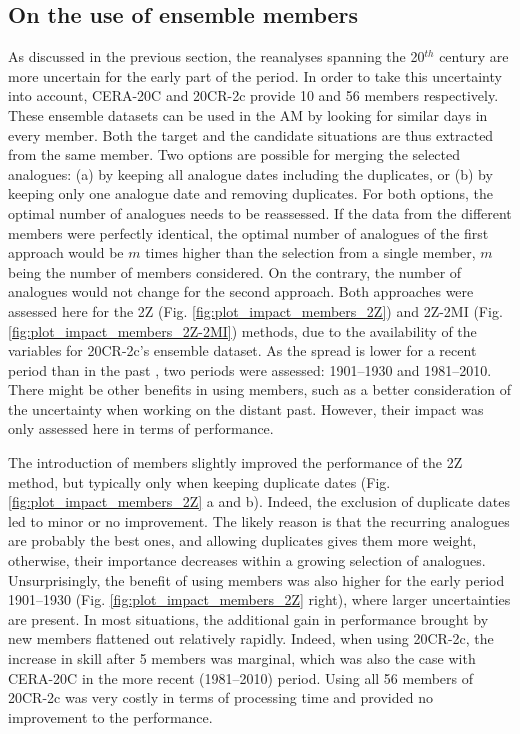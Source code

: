 \documentclass{ametsoc}
\begin{document}
	
	\subsection{On the use of ensemble members}
	\label{sec:ensemble}
	
	As discussed in the previous section, the reanalyses spanning the 20$^{th}$ century are more uncertain for the early part of the period. In order to take this uncertainty into account, CERA-20C and 20CR-2c provide 10 and 56 members respectively. These ensemble datasets can be used in the AM by looking for similar days in every member. Both the target and the candidate situations are thus extracted from the same member. Two options are possible for merging the selected analogues: (a) by keeping all analogue dates including the duplicates, or (b) by keeping only one analogue date and removing duplicates. For both options, the optimal number of analogues needs to be reassessed. If the data from the different members were perfectly identical, the optimal number of analogues of the first approach would be $m$ times higher than the selection from a single member, $m$ being the number of members considered. On the contrary, the number of analogues would not change for the second approach. Both approaches were assessed here for the 2Z (Fig. \ref{fig:plot_impact_members_2Z}) and 2Z-2MI (Fig. \ref{fig:plot_impact_members_2Z-2MI}) methods, due to the availability of the variables for 20CR-2c's ensemble dataset. As the spread is lower for a recent period than in the past \citep{Compo2011}, two periods were assessed: 1901--1930 and 1981--2010. There might be other benefits in using members, such as a better consideration of the uncertainty when working on the distant past. However, their impact was only assessed here in terms of performance.
	
	The introduction of members slightly improved the performance of the 2Z method, but typically only when keeping duplicate dates (Fig. \ref{fig:plot_impact_members_2Z} a and b). Indeed, the exclusion of duplicate dates led to minor or no improvement. The likely reason is that the recurring analogues are probably the best ones, and allowing duplicates gives them more weight, otherwise, their importance decreases within a growing selection of analogues. Unsurprisingly, the benefit of using members was also higher for the early period 1901--1930 (Fig. \ref{fig:plot_impact_members_2Z} right), where larger uncertainties are present. In most situations, the additional gain in performance brought by new members flattened out relatively rapidly. Indeed, when using 20CR-2c, the increase in skill after 5 members was marginal, which was also the case with CERA-20C in the more recent (1981--2010) period. Using all 56 members of 20CR-2c was very costly in terms of processing time and provided no improvement to the performance. 
	
\end{document}
